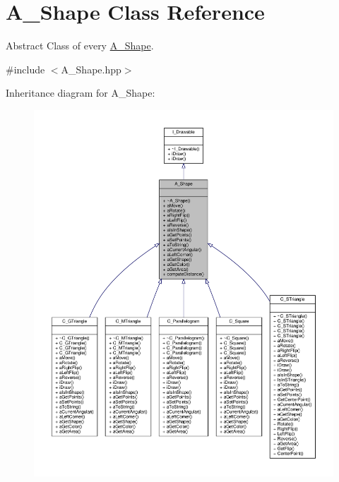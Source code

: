 \hypertarget{classA__Shape}{}\section{A\+\_\+\+Shape Class Reference}
\label{classA__Shape}


Abstract Class of every \hyperlink{classA__Shape}{A\+\_\+\+Shape}.  




{\ttfamily \#include $<$A\+\_\+\+Shape.\+hpp$>$}



Inheritance diagram for A\+\_\+\+Shape\+:
\nopagebreak
\begin{figure}[H]
\begin{center}
\leavevmode
\includegraphics[width=350pt]{classA__Shape__inherit__graph}
\end{center}
\end{figure}


